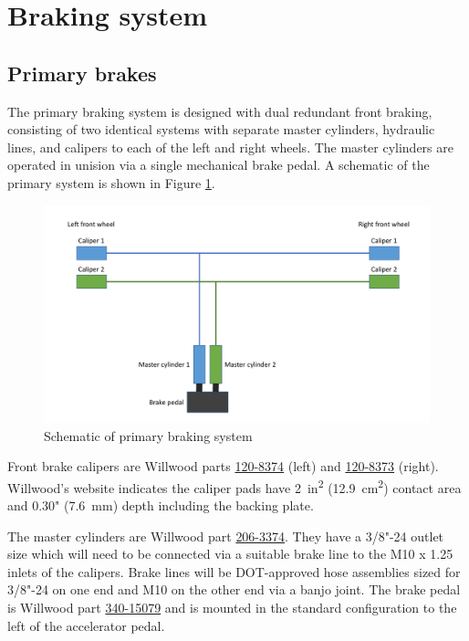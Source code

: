 \documentclass[10pt]{article}
\begin{document}
\section{Braking system}
\subsection{Primary brakes}
The primary braking system is designed with dual redundant front braking, consisting of two identical systems with separate master cylinders, hydraulic lines, and calipers to each of the left and right wheels. The master cylinders are operated in unision via a single mechanical brake pedal. A schematic of the primary system is shown in Figure \ref{fig:primary-brakes-schematic}.

\begin{figure}
\centering
\includegraphics[width=\textwidth]{figures/primary-brakes-schematic}
\caption{Schematic of primary braking system}
\label{fig:primary-brakes-schematic}
\end{figure}

Front brake calipers are Willwood parts \href{http://www.wilwood.com/Calipers/CaliperProd.aspx?itemno=120-8374}{120-8374} (left) and \href{http://www.wilwood.com/Calipers/CaliperProd.aspx?itemno=120-8373}{120-8373} (right). Willwood's website indicates the caliper pads have \SI{2}{in\squared} (\SI{12.9}{\centi\metre\squared}) contact area and 0.30" (\SI{7.6}{\milli\metre}) depth including the backing plate.

The master cylinders are Willwood part \href{http://www.wilwood.com/MasterCylinders/MasterCylinderProd.aspx?itemno=260-3374}{206-3374}. They have a 3/8"-24 outlet size which will need to be connected via a suitable brake line to the M10 x 1.25 inlets of the calipers. Brake lines will be DOT-approved hose assemblies sized for 3/8"-24 on one end and M10 on the other end via a banjo joint. The brake pedal is Willwood part \href{http://www.wilwood.com/Pedals/PedalProd.aspx?itemno=340-15079}{340-15079} and is mounted in the standard configuration to the left of the accelerator pedal.
\end{document}
